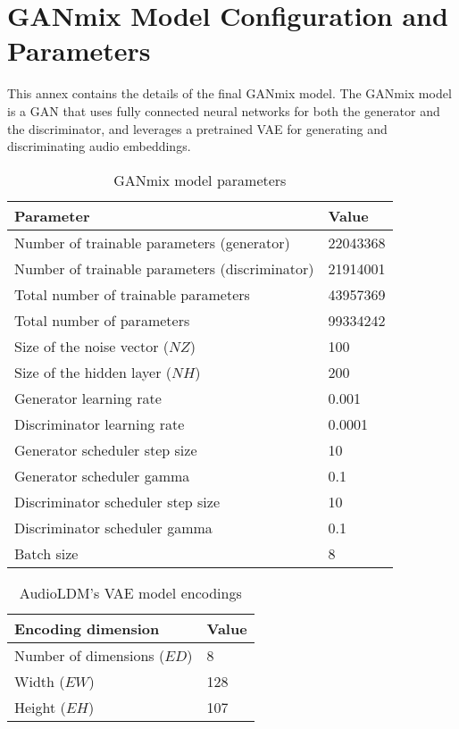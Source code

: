 \chapter{GANmix Model Configuration and Parameters}
\label{ann:ganmix-conf}

This annex contains the details of the final GANmix model. The GANmix model is a \ac{GAN} that uses fully connected neural networks for both the generator and the discriminator, and leverages a pretrained \ac{VAE} for generating and discriminating audio embeddings.

\begin{table}[h]
\centering
\caption{GANmix model parameters}
\label{tab:ganmix-params}
\begin{tabular}{|l|l|}
\hline
Parameter & Value \\ \hline
Number of trainable parameters (generator) & 22043368 \\ \hline
Number of trainable parameters (discriminator) & 21914001 \\ \hline
Total number of trainable parameters & 43957369 \\ \hline
Total number of parameters & 99334242 \\ \hline
Size of the noise vector ($NZ$) & 100 \\ \hline
Size of the hidden layer ($NH$) & 200 \\ \hline
Generator learning rate & 0.001 \\ \hline
Discriminator learning rate & 0.0001 \\ \hline
Generator scheduler step size & 10 \\ \hline
Generator scheduler gamma & 0.1 \\ \hline
Discriminator scheduler step size & 10 \\ \hline
Discriminator scheduler gamma & 0.1 \\ \hline
Batch size & 8 \\ \hline
\end{tabular}
\end{table}

\begin{table}[h]
\centering
\caption{AudioLDM's \ac{VAE} model encodings}
\label{tab:ganmix-encodings}
\begin{tabular}{|l|l|}
\hline
Encoding dimension & Value \\ \hline
Number of dimensions ($ED$) & 8 \\ \hline
Width ($EW$) & 128 \\ \hline
Height ($EH$) & 107 \\ \hline
\end{tabular}
\end{table}

